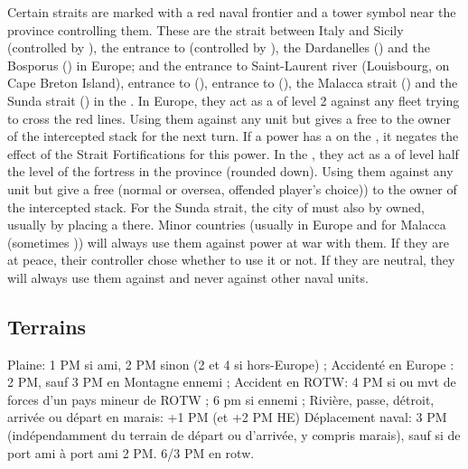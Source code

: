 \label{chMilitary:Strait Fortifications}Certain
straits are marked with a red naval frontier and a tower symbol near
the province controlling them. These are the strait between Italy and
Sicily (controlled by ), the entrance to
 (controlled by ), the
Dardanelles () and the Bosporus
() in Europe; and the entrance to Saint-Laurent river
(Louisbourg, on Cape Breton Island), entrance to 
(), entrance to  (),
the Malacca strait () and the Sunda strait
() in the \ROTW.
\bparag In Europe, they act as a \Presidio of level 2 against any fleet
trying to cross the red lines. Using them against any unit but \corsaire
gives a free \CB to the owner of the intercepted stack for the next
turn.
\bparag If a power has a \Presidio on the , it
negates the effect of the Strait Fortifications for this power.
\bparag In the \ROTW, they act as a \Presidio of level half the level of
the fortress in the province (rounded down). Using them against any unit
but \corsaire give a free \CB (normal or oversea, offended player's
choice)) to the owner of the intercepted stack.
\bparag For the Sunda strait, the city of  must also by
owned, usually by placing a \COL there.
\bparag Minor countries (usually  in Europe and
 for Malacca (sometimes )) will always use
them against power at war with them. If they are at peace, their
controller chose whether to use it or not. If they are neutral, they
will always use them against \corsaire and never against other naval
units.



\subsection{Terrains}

\bparag Plaine: 1 PM si ami, 2 PM sinon (2 et 4 si hors-Europe) ;
\bparag Accidenté en Europe : 2 PM, sauf 3 PM en Montagne ennemi ;
\bparag Accident en ROTW: 4 PM si ou mvt de forces d'un pays mineur de
ROTW ; 6 pm si ennemi ;
\bparag Rivière, passe, détroit, arrivée ou départ en marais: +1 PM (et
+2 PM HE)
\bparag Déplacement naval: 3 PM (indépendamment du terrain de départ ou
d'arrivée, y compris marais), sauf si de port ami à port ami 2 PM. 6/3
PM en rotw.

